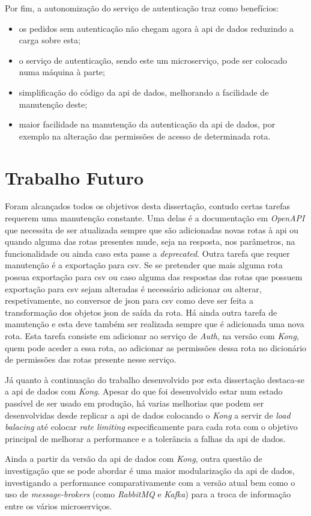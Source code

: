 Por fim, a autonomização do serviço de autenticação traz como benefícios:
\begin{itemize}
    \item os pedidos sem autenticação não chegam agora à \acrshort{api} de dados reduzindo a carga sobre esta;
    \item o serviço de autenticação, sendo este um microserviço, pode ser colocado numa máquina à parte;
    \item simplificação do código da \acrshort{api} de dados, melhorando a facilidade de manutenção deste;
    \item maior facilidade na manutenção da autenticação da \acrshort{api} de dados, por exemplo na alteração das permissões de acesso de determinada rota.
\end{itemize}

\section{Trabalho Futuro}

Foram alcançados todos os objetivos desta dissertação, contudo certas tarefas requerem uma manutenção constante. Uma delas é a documentação em \textit{OpenAPI} que necessita de ser atualizada sempre que são adicionadas novas rotas à \acrshort{api} ou quando alguma das rotas presentes mude, seja na resposta, nos parâmetros, na funcionalidade ou ainda caso esta passe a \textit{deprecated}. Outra tarefa que requer manutenção é a exportação para \acrshort{csv}. Se se pretender que mais alguma rota possua exportação para \acrshort{csv} ou caso alguma das respostas das rotas que possuem exportação para \acrshort{csv} sejam alteradas é necessário adicionar ou alterar, respetivamente, no conversor de \acrshort{json} para \acrshort{csv} como deve ser feita a transformação dos objetos \acrshort{json} de saída da rota. Há ainda outra tarefa de manutenção e esta deve também ser realizada sempre que é adicionada uma nova rota. Esta tarefa consiste em adicionar ao serviço de \textit{Auth}, na versão com \textit{Kong}, quem pode aceder a essa rota, ao adicionar as permissões dessa rota no dicionário de permissões das rotas presente nesse serviço.

Já quanto à continuação do trabalho desenvolvido por esta dissertação destaca-se a \acrshort{api} de dados com \textit{Kong}. Apesar do que foi desenvolvido estar num estado passível de ser usado em produção, há varias melhorias que podem ser desenvolvidas desde replicar a \acrshort{api} de dados colocando o \textit{Kong} a servir de \textit{load balacing} até colocar \textit{rate limiting} especificamente para cada rota com o objetivo principal de melhorar a performance e a tolerância a falhas da \acrshort{api} de dados.

Ainda a partir da versão da \acrshort{api} de dados com \textit{Kong}, outra questão de investigação que se pode abordar é uma maior modularização da \acrshort{api} de dados, investigando a performance comparativamente com a versão atual bem como o uso de \textit{message-brokers} (como \textit{RabbitMQ} e \textit{Kafka}) para a troca de informação entre os vários microserviços. 
